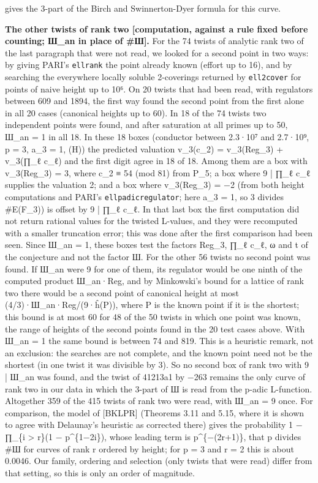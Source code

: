 \documentclass[11pt,a4paper]{article}
\theoremstyle{named}
\begin{document}
gives the 3-part of the Birch and Swinnerton-Dyer formula for this curve.

\textbf{The other twists of rank two [computation, against a rule fixed before counting; Ш\_an in place of \#Ш].} For the 74 twists of analytic rank two of the last paragraph that were not read, we looked for a second point in two ways: by giving PARI's \texttt{ellrank} the point already known (effort up to 16), and by searching the everywhere locally soluble 2-coverings returned by \texttt{ell2cover} for points of naive height up to 10⁶. On 20 twists that had been read, with regulators between 609 and 1894, the first way found the second point from the first alone in all 20 cases (canonical heights up to 60). In 18 of the 74 twists two independent points were found, and after saturation at all primes up to 50, Ш\_an = 1 in all 18. In these 18 boxes (conductor between 2.3·10⁷ and 2.7·10⁹, p = 3, a\_3 = 1, (H)) the predicted valuation v\_3(c\_2) = v\_3(Reg\_3) + v\_3(∏\_ℓ c\_ℓ) and the first digit agree in 18 of 18. Among them are a box with v\_3(Reg\_3) = 3, where c\_2 ≡ 54 (mod 81) from P\_5; a box where 9 | ∏\_ℓ c\_ℓ supplies the valuation 2; and a box where v\_3(Reg\_3) = −2 (from both height computations and PARI's \texttt{ellpadicregulator}; here a\_3 = 1, so 3 divides \#E(F\_3)) is offset by 9 | ∏\_ℓ c\_ℓ. In that last box the first computation did not return rational values for the twisted L-values, and they were recomputed with a smaller truncation error; this was done after the first comparison had been seen. Since Ш\_an = 1, these boxes test the factors Reg\_3, ∏\_ℓ c\_ℓ, ω and t of the conjecture and not the factor Ш. For the other 56 twists no second point was found. If Ш\_an were 9 for one of them, its regulator would be one ninth of the computed product Ш\_an·Reg, and by Minkowski's bound for a lattice of rank two there would be a second point of canonical height at most (4/3)·Ш\_an·Reg/(9·ĥ(P)), where P is the known point if it is the shortest; this bound is at most 60 for 48 of the 50 twists in which one point was known, the range of heights of the second points found in the 20 test cases above. With Ш\_an = 1 the same bound is between 74 and 819. This is a heuristic remark, not an exclusion: the searches are not complete, and the known point need not be the shortest (in one twist it was divisible by 3). So no second box of rank two with 9 | Ш\_an was found, and the twist of 41213a1 by −263 remains the only curve of rank two in our data in which the 3-part of Ш is read from the p-adic L-function. Altogether 359 of the 415 twists of rank two were read, with Ш\_an = 9 once. For comparison, the model of [BKLPR] (Theorems 3.11 and 5.15, where it is shown to agree with Delaunay's heuristic as corrected there) gives the probability 1 − ∏\_\{i \textgreater{} r\}(1 − p\textasciicircum{}\{1−2i\}), whose leading term is p\textasciicircum{}\{−(2r+1)\}, that p divides \#Ш for curves of rank r ordered by height; for p = 3 and r = 2 this is about 0.0046. Our family, ordering and selection (only twists that were read) differ from that setting, so this is only an order of magnitude.
\end{document}
